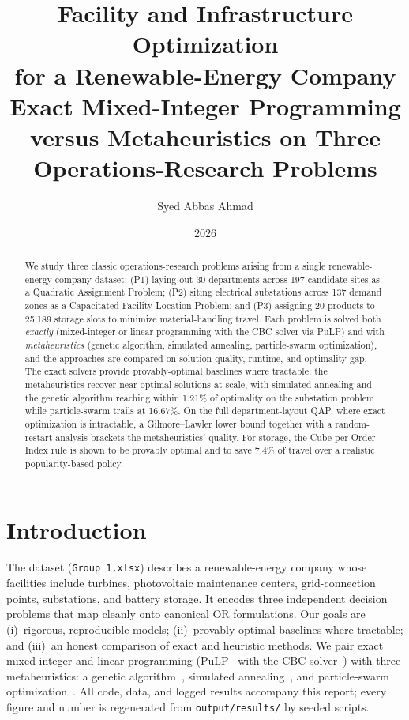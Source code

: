 \documentclass[11pt]{article}
\title{\textbf{Facility and Infrastructure Optimization\\ for a Renewable-Energy Company}\\
\large Exact Mixed-Integer Programming versus Metaheuristics on Three Operations-Research Problems}
\author{Syed Abbas Ahmad}
\date{2026}
\newcommand{\Pgagap}{1.21}          %
\newcommand{\Ppsogap}{16.67}        %
\newcommand{\PthreePopSave}{7.4}    %
\begin{document}
\maketitle

\begin{abstract}
We study three classic operations-research problems arising from a single
renewable-energy company dataset: (P1) laying out 30 departments across 197
candidate sites as a Quadratic Assignment Problem; (P2) siting electrical
substations across 137 demand zones as a Capacitated Facility Location Problem;
and (P3) assigning 20 products to 25{,}189 storage slots to minimize
material-handling travel. Each problem is solved both \emph{exactly} (mixed-integer
or linear programming with the CBC solver via PuLP) and with \emph{metaheuristics}
(genetic algorithm, simulated annealing, particle-swarm optimization), and the
approaches are compared on solution quality, runtime, and optimality gap. The
exact solvers provide provably-optimal baselines where tractable; the
metaheuristics recover near-optimal solutions at scale, with simulated annealing
and the genetic algorithm reaching within \Pgagap\% of optimality on the
substation problem while particle-swarm trails at \Ppsogap\%. On the full
department-layout QAP, where exact optimization is intractable, a
Gilmore--Lawler lower bound together with a random-restart analysis brackets the
metaheuristics' quality. For storage, the Cube-per-Order-Index rule is shown to
be provably optimal and to save \PthreePopSave\% of travel over a realistic
popularity-based policy.
\end{abstract}

\section{Introduction}
The dataset (\texttt{Group 1.xlsx}) describes a renewable-energy company whose
facilities include turbines, photovoltaic maintenance centers, grid-connection
points, substations, and battery storage. It encodes three independent decision
problems that map cleanly onto canonical OR formulations. Our goals are
(i)~rigorous, reproducible models; (ii)~provably-optimal baselines where
tractable; and (iii)~an honest comparison of exact and heuristic methods. We pair exact
mixed-integer and linear programming (PuLP~\cite{mitchell2011pulp} with the CBC
solver~\cite{forrest2005cbc}) with three metaheuristics: a genetic
algorithm~\cite{goldberg1989genetic}, simulated
annealing~\cite{kirkpatrick1983optimization}, and particle-swarm
optimization~\cite{kennedy1995particle}. All code, data, and logged results
accompany this report; every figure and number is regenerated from
\texttt{output/results/} by seeded scripts.
\end{document}
